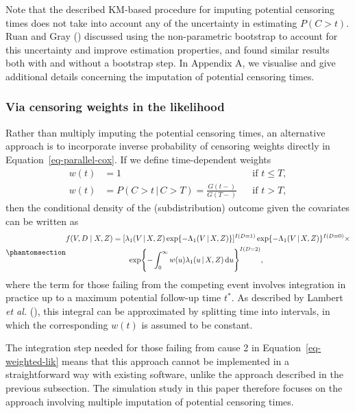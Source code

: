 \documentclass[
  letterpaper,
  paper=240mm:170mm,
  twoside=true,
  open=right,
  fontsize=10pt,
  pagesize=false,
  BCOR=15mm,
  DIV=14,
  headinclude=true,
  footinclude=false,
  headsepline=on]{scrbook}
\newcommand{\given}{\,|\,}
\newcommand\diff{\mathop{}\!\mathrm{d}}
\begin{document}
Note that the described KM-based procedure for imputing potential
censoring times does not take into account any of the uncertainty in
estimating \(P(C > t)\). Ruan and Gray
() discussed
using the non-parametric bootstrap to account for this uncertainty and
improve estimation properties, and found similar results both with and
without a bootstrap step. In Appendix A, we visualise and give
additional details concerning the imputation of potential censoring
times.

\subsubsection{Via censoring weights in the
likelihood}\label{via-censoring-weights-in-the-likelihood}

Rather than multiply imputing the potential censoring times, an
alternative approach is to incorporate inverse probability of censoring
weights directly in Equation~\ref{eq-parallel-cox}. If we define
time-dependent weights \begin{equation*}
    \begin{aligned}
        w(t) &= 1 && \text{if } t \leq T,\\
        w(t) &= P(C > t \given C > T) = \frac{G(t-)}{G(T-)} && \text{if } t > T,
    \end{aligned}
\end{equation*} then the conditional density of the (subdistribution)
outcome given the covariates can be written as
\begin{equation}\phantomsection\label{eq-weighted-lik}{
\begin{aligned}
    f(V, D \mid X, Z) &= [\lambda_1(V \given X, Z)\exp\{- \Lambda_1(V \given X, Z)\}]^{I(D = 1)}\exp\{- \Lambda_1(V \given X, Z)\}^{I(D = 0)} \times  \\
    &\qquad \exp\Biggl\{- \int_{0}^{\infty}w(u)\lambda_1(u\given X, Z)\diff u\Biggr\}^{I(D = 2)}, 
\end{aligned}
}\end{equation} where the term for those failing from the competing
event involves integration in practice up to a maximum potential
follow-up time \(t^*\). As described by Lambert \emph{et al.}
(), this
integral can be approximated by splitting time into intervals, in which
the corresponding \(w(t)\) is assumed to be constant.

The integration step needed for those failing from cause 2 in
Equation~\ref{eq-weighted-lik} means that this approach cannot be
implemented in a straightforward way with existing software, unlike the
approach described in the previous subsection. The simulation study in
this paper therefore focuses on the approach involving multiple
imputation of potential censoring times.
\end{document}
